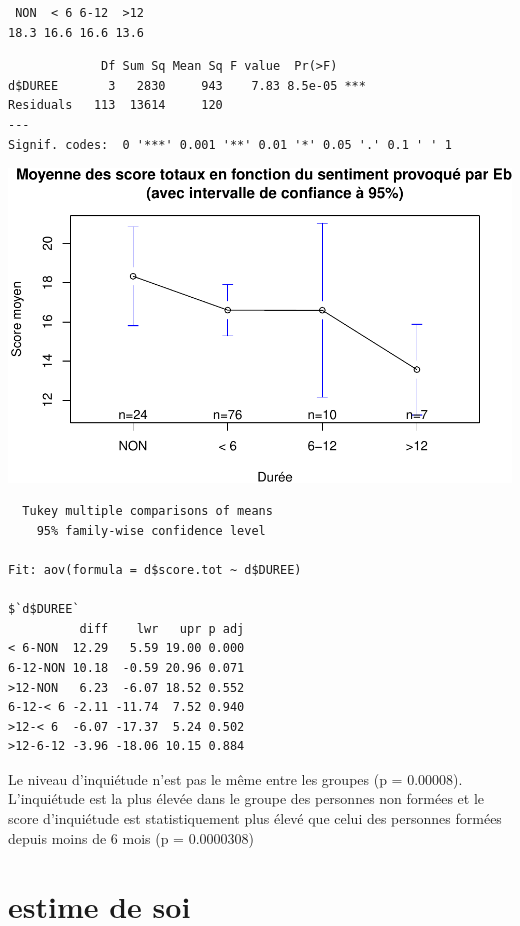 \documentclass[]{article}
\begin{document}
\begin{verbatim}
 NON  < 6 6-12  >12 
18.3 16.6 16.6 13.6 
\end{verbatim}

\begin{verbatim}
             Df Sum Sq Mean Sq F value  Pr(>F)    
d$DUREE       3   2830     943    7.83 8.5e-05 ***
Residuals   113  13614     120                    
---
Signif. codes:  0 '***' 0.001 '**' 0.01 '*' 0.05 '.' 0.1 ' ' 1
\end{verbatim}

\includegraphics{analyse_files/figure-latex/unnamed-chunk-23-1.pdf}

\begin{verbatim}
  Tukey multiple comparisons of means
    95% family-wise confidence level

Fit: aov(formula = d$score.tot ~ d$DUREE)

$`d$DUREE`
          diff    lwr   upr p adj
< 6-NON  12.29   5.59 19.00 0.000
6-12-NON 10.18  -0.59 20.96 0.071
>12-NON   6.23  -6.07 18.52 0.552
6-12-< 6 -2.11 -11.74  7.52 0.940
>12-< 6  -6.07 -17.37  5.24 0.502
>12-6-12 -3.96 -18.06 10.15 0.884
\end{verbatim}

Le niveau d'inquiétude n'est pas le même entre les groupes (p =
0.00008). L'inquiétude est la plus élevée dans le groupe des personnes
non formées et le score d'inquiétude est statistiquement plus élevé que
celui des personnes formées depuis moins de 6 mois (p = 0.0000308)

\section{estime de soi}\label{estime-de-soi}
\end{document}
